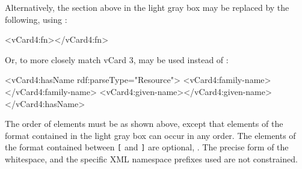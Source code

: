 \begin{blockChanged}
Alternatively, the  section above in the light gray box may be replaced by the following, using :

\vspace*{1ex}
\begin{example}
\colorbox[gray]{.94}{\begin{minipage}{5.1in}\begin{example}
\otherContent
<vCard4:fn>\fullNameNS</vCard4:fn>
\otherContent
\end{example}\end{minipage}}
\end{example}
\vspace*{1ex}

Or, to more closely match vCard 3,  may be used instead of :

\vspace*{1ex}
\begin{example}
\colorbox[gray]{.94}{\begin{minipage}{5.1in}\begin{example}
\otherContent
<vCard4:hasName rdf:parseType="Resource">
  <vCard4:family-name>\familyNameNS</vCard4:family-name>
  <vCard4:given-name>\givenNameNS</vCard4:given-name>
</vCard4:hasName>
\otherContent
\end{example}\end{minipage}}
\end{example}
\vspace*{1ex}

\end{blockChanged}


The order of elements must be as shown above, except that elements
of the format contained in the light gray box  can occur in any
order.  The elements of the format contained between \texttt{[}
and \texttt{]}  are optional, .  The precise form of the whitespace,
and the specific XML namespace prefixes used  are not constrained.

